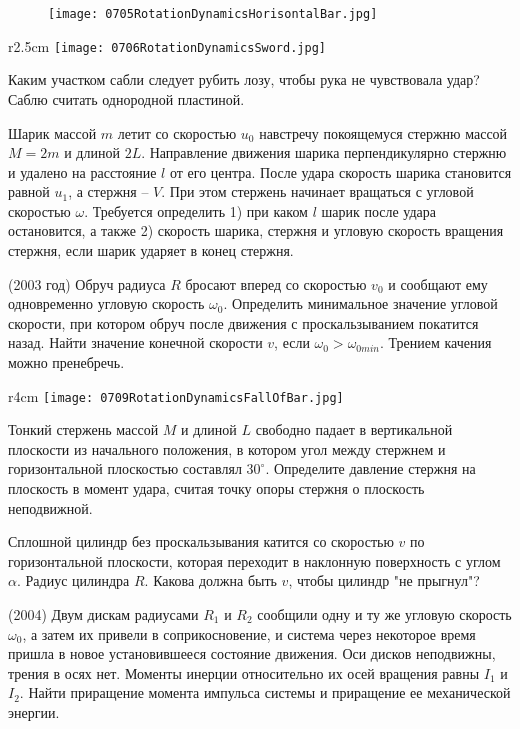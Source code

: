 \begin{figure}[h]
\centering
\texttt{[image: 0705RotationDynamicsHorisontalBar.jpg]}
\end{figure}

\begin{wrapfigure}{r}{2.5cm}
\texttt{[image: 0706RotationDynamicsSword.jpg]}
\end{wrapfigure}

\AddProb Каким участком сабли следует рубить лозу, чтобы рука не чувствовала удар? Саблю считать однородной пластиной.

\AddProb Шарик массой $m$ летит со скоростью $u_0$ навстречу покоящемуся стержню массой $M = 2m$ и длиной $2L$. 
Направление движения шарика перпендикулярно стержню и удалено на расстояние $l$ от его центра. 
После удара скорость шарика становится равной $u_1$, а стержня -- $V$. При этом стержень начинает вращаться с угловой скоростью $\omega$. 
Требуется определить 1) при каком $l$ шарик после удара остановится, а также 
2) скорость шарика, стержня и угловую скорость вращения стержня, если шарик ударяет в конец стержня.

\AddProb (2003 год) Обруч радиуса $R$ бросают вперед со скоростью $v_0$ и сообщают ему одновременно угловую скорость $\omega_0$. 
Определить минимальное значение угловой скорости, при котором обруч после движения с проскальзыванием покатится назад. 
Найти значение конечной скорости $v$, если $\omega_0 > \omega_{0min} $. Трением качения можно пренебречь.

\begin{wrapfigure}{r}{4cm}
\texttt{[image: 0709RotationDynamicsFallOfBar.jpg]}
\end{wrapfigure}

\AddProb Тонкий стержень массой $M$ и длиной $L$ свободно падает в вертикальной плоскости из начального положения, 
в котором угол между стержнем и горизонтальной плоскостью составлял $30^{\circ}$. 
Определите давление стержня на плоскость в момент удара, считая точку опоры стержня о плоскость неподвижной.

\AddProb Сплошной цилиндр без проскальзывания катится со скоростью $v$ по горизонтальной плоскости, 
которая переходит в наклонную поверхность с углом $\alpha$. Радиус цилиндра $R$. Какова должна быть $v$, чтобы цилиндр "не прыгнул"?

\AddProb (2004) Двум дискам радиусами $R_1$ и $R_2$ сообщили одну и ту же угловую скорость $\omega_0$,
 а затем их привели в соприкосновение, и система через некоторое время пришла в новое установившееся состояние движения. 
Оси дисков неподвижны, трения в осях нет. Моменты инерции относительно их осей вращения равны $I_1$ и $I_2$. 
Найти приращение момента импульса системы и приращение ее механической энергии.


